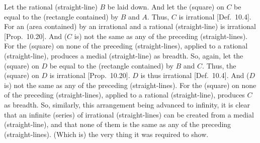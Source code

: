 \begin{Parallel}{}{}
{Let the rational (straight-line) $B$ be laid down. And let the (square) on $C$
be equal to the (rectangle contained) by $B$ and $A$. Thus, $C$ is
irrational [Def.~10.4]. For an (area contained) by
an irrational and a rational (straight-line) is irrational [Prop.~10.20]. And ($C$ is) not the same as
any of the preceding (straight-lines). For the (square) on none of
the preceding (straight-lines), applied to a rational (straight-line),
produces a medial (straight-line) as breadth. So, again, let the (square)
on $D$ be equal to the (rectangle contained) by $B$ and $C$. Thus,
the (square) on $D$ is irrational [Prop.~10.20]. 
$D$ is thus irrational [Def.~10.4]. And ($D$ is)
not the same as any of the preceding (straight-lines). For the (square) on
none of the preceding (straight-lines), applied to a rational (straight-line),
produces $C$ as breadth. So, similarly, this arrangement being
advanced to infinity, it is clear that an infinite (series) of irrational (straight-lines) can be created from a medial
(straight-line), and that none of them is the same as any of the preceding
(straight-lines). (Which is) the very thing it was required to show.}
\end{Parallel}

\newpage
\thispagestyle{empty}
~\\